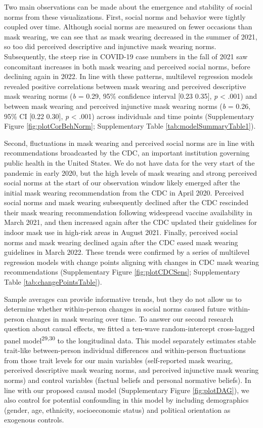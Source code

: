 \documentclass[
  man, donotrepeattitle,floatsintext]{apa6}
\begin{document}
Two main observations can be made about the emergence and stability of social norms from these visualizations. First, social norms and behavior were tightly coupled over time. Although social norms are measured on fewer occasions than mask wearing, we can see that as mask wearing decreased in the summer of 2021, so too did perceived descriptive and injunctive mask wearing norms. Subsequently, the steep rise in COVID-19 case numbers in the fall of 2021 saw concomitant increases in both mask wearing and perceived social norms, before declining again in 2022. In line with these patterns, multilevel regression models revealed positive correlations between mask wearing and perceived descriptive mask wearing norms (\emph{b} = 0.29, 95\% confidence interval {[}0.23 0.35{]}, \emph{p} \textless{} .001) and between mask wearing and perceived injunctive mask wearing norms (\emph{b} = 0.26, 95\% CI {[}0.22 0.30{]}, \emph{p} \textless{} .001) across individuals and time points (Supplementary Figure \ref{fig:plotCorBehNorm}; Supplementary Table \ref{tab:modelSummaryTable1}).

Second, fluctuations in mask wearing and perceived social norms are in line with recommendations broadcasted by the CDC, an important institution governing public health in the United States. We do not have data for the very start of the pandemic in early 2020, but the high levels of mask wearing and strong perceived social norms at the start of our observation window likely emerged after the initial mask wearing recommendation from the CDC in April 2020. Perceived social norms and mask wearing subsequently declined after the CDC rescinded their mask wearing recommendation following widespread vaccine availability in March 2021, and then increased again after the CDC updated their guidelines for indoor mask use in high-risk areas in August 2021. Finally, perceived social norms and mask wearing declined again after the CDC eased mask wearing guidelines in March 2022. These trends were confirmed by a series of multilevel regression models with change points aligning with changes in CDC mask wearing recommendations (Supplementary Figure \ref{fig:plotCDCSens}; Supplementary Table \ref{tab:changePointsTable}).

Sample averages can provide informative trends, but they do not allow us to determine whether within-person changes in social norms caused future within-person changes in mask wearing over time. To answer our second research question about causal effects, we fitted a ten-wave random-intercept cross-lagged panel model\textsuperscript{29,30} to the longitudinal data. This model separately estimates stable trait-like between-person individual differences and within-person fluctuations from those trait levels for our main variables (self-reported mask wearing, perceived descriptive mask wearing norms, and perceived injunctive mask wearing norms) and control variables (factual beliefs and personal normative beliefs). In line with our proposed causal model (Supplementary Figure \ref{fig:plotDAG}), we also control for potential confounding in this model by including demographics (gender, age, ethnicity, socioeconomic status) and political orientation as exogenous controls.
\end{document}
